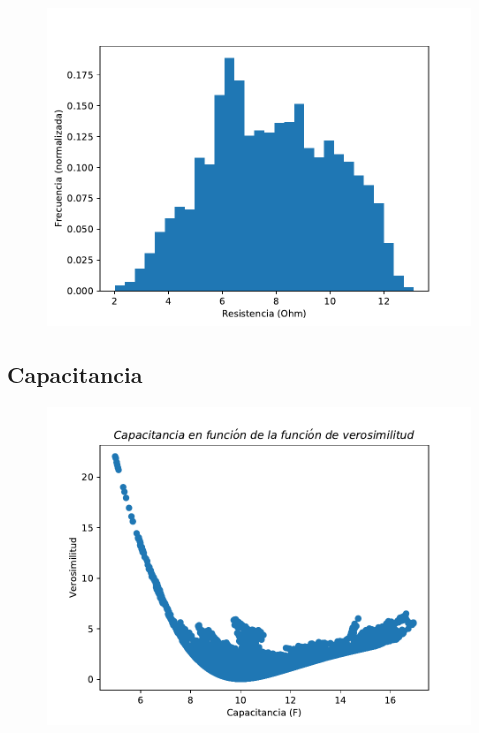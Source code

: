 \documentclass[12pt,letterpaper]{article}
\begin{document}
\begin{figure}[H]
\includegraphics{r_hist.pdf}
\centering
\end{figure}

\subsection{Capacitancia}

\begin{figure}[H]
\includegraphics{c_verosimilitud.pdf}
\centering
\end{figure}
\end{document}
